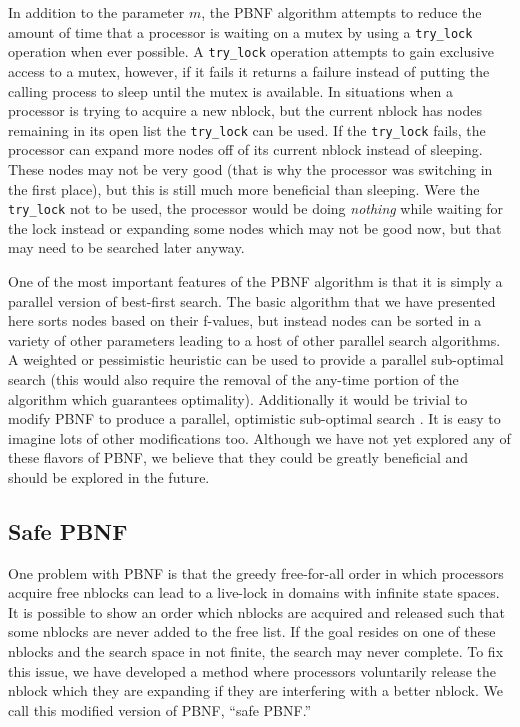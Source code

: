 \documentclass{article}
\begin{document}
In addition to the parameter $m$, the PBNF algorithm attempts to
reduce the amount of time that a processor is waiting on a mutex by
using a \texttt{try\_lock} operation when ever possible.  A
\texttt{try\_lock} operation attempts to gain exclusive access to a
mutex, however, if it fails it returns a failure instead of putting
the calling process to sleep until the mutex is available.  In
situations when a processor is trying to acquire a new nblock, but the
current nblock has nodes remaining in its open list the
\texttt{try\_lock} can be used.  If the \texttt{try\_lock} fails, the
processor can expand more nodes off of its current nblock instead of
sleeping.  These nodes may not be very good (that is why the processor
was switching in the first place), but this is still much more
beneficial than sleeping.  Were the \texttt{try\_lock} not to be used,
the processor would be doing \emph{nothing} while waiting for the lock
instead or expanding some nodes which may not be good now, but that
may need to be searched later anyway.

One of the most important features of the PBNF algorithm is that it is
simply a parallel version of best-first search.  The basic algorithm
that we have presented here sorts nodes based on their f-values, but
instead nodes can be sorted in a variety of other parameters leading
to a host of other parallel search algorithms.  A weighted or
pessimistic heuristic can be used to provide a parallel sub-optimal
search (this would also require the removal of the any-time portion of
the algorithm which guarantees optimality).  Additionally it would be
trivial to modify PBNF to produce a parallel, optimistic sub-optimal
search \cite{thayer:fas}.  It is easy to imagine lots of other
modifications too.  Although we have not yet explored any of these
flavors of PBNF, we believe that they could be greatly beneficial and
should be explored in the future.

\subsection{Safe PBNF}

One problem with PBNF is that the greedy free-for-all order in which
processors acquire free nblocks can lead to a live-lock in domains
with infinite state spaces.  It is possible to show an order which
nblocks are acquired and released such that some nblocks are never
added to the free list.  If the goal resides on one of these nblocks
and the search space in not finite, the search may never complete.  To
fix this issue, we have developed a method where processors
voluntarily release the nblock which they are expanding if they are
interfering with a better nblock.  We call this modified version of
PBNF, ``safe PBNF.''
\end{document}
